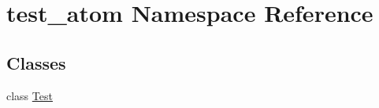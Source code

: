 \hypertarget{namespacetest__atom}{\section{test\-\_\-atom Namespace Reference}
\label{namespacetest__atom}
}
\subsection*{Classes}
\begin{DoxyCompactItemize}
\item 
class \hyperlink{classtest__atom_1_1_test}{Test}
\end{DoxyCompactItemize}
